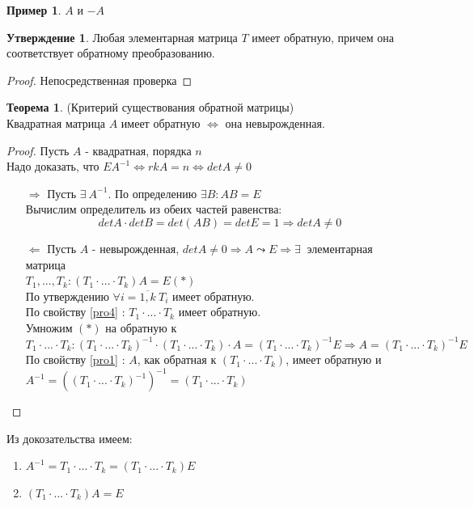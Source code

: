 \documentclass[a4paper, 12pt]{article}
\theoremstyle{definition}
\newtheorem*{theorem}{Теорема}
\newtheorem*{subtheorem}{Утверждение}
\newtheorem*{example1}{Пример}
\begin{document}
  \begin{example1}
    $A$ и $-A$ 
  \end{example1}
  \begin{subtheorem}
    Любая элементарная матрица $T$ имеет обратную, причем она соответствует обратному преобразованию. 
  \end{subtheorem} 
  \begin{proof}
    Непосредственная проверка
  \end{proof}
  \begin{theorem}
    (Критерий существования обратной матрицы) \\
    Квадратная матрица $A$ имеет обратную $\Longleftrightarrow $ она невырожденная.
  \end{theorem} 
  \begin{proof}
    Пусть $A$ - квадратная, порядка $n$ \\
    Надо доказать, что $EA^{-1} \Longleftrightarrow rkA = n \Longleftrightarrow detA \not = 0$ 
    \begin{itemize}
      \item[\underline{$\Longrightarrow$}] Пусть $\exists \ A^{-1}$. По определению $\exists B: AB = E$ \\
      Вычислим определитель из обеих частей равенства:
      $$detA\cdot detB = det(AB) = detE = 1 \Longrightarrow detA \not = 0$$ 
      \item[\underline{$\Longleftarrow$}] Пусть $A$ - невырожденная, $detA \not = 0 \Longrightarrow A \leadsto E \Longrightarrow \exists \ $ элементарная матрица \\
      $T_1,...,T_k: (T_1 \cdot ... \cdot T_k)A = E (*)$ \\
      По утверждению $\forall i = \overline{1,k} \ T_i$ имеет обратную.\\
      По свойству \eqref{pro4} : $T_1 \cdot ... \cdot T_k$ имеет обратную. \\
      Умножим $(*)$ на обратную к $T_1 \cdot ... \cdot T_k: (T_1 \cdot ... \cdot T_k)^{-1} \cdot (T_1 \cdot ... \cdot T_k) \cdot A = (T_1 \cdot ... \cdot T_k)^{-1}E \Longrightarrow A = (T_1 \cdot ... \cdot T_k)^{-1}E$ \\
      По свойству \eqref{pro1} : $A$, как обратная к $(T_1 \cdot ... \cdot T_k)$, имеет обратную и $A^{-1} = ((T_1 \cdot ... \cdot T_k)^{-1})^{-1} = (T_1 \cdot ... \cdot T_k)$
    \end{itemize}
  \end{proof} 
  Из докозательства имеем:  
  \begin{enumerate}
    \item $A^{-1} = T_1 \cdot ... \cdot T_k = (T_1 \cdot ... \cdot T_k)E$
    \item $(T_1 \cdot ... \cdot T_k)A =E$ 
  \end{enumerate}
\end{document}
